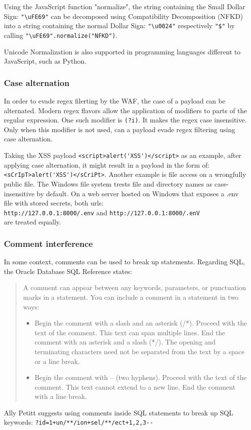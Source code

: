 Using the JavaScript function "normalize", the string containing the Small Dollar Sign: \verb|"\uFE69"| can be decomposed using Compatibility Decomposition (NFKD) into a string containing the normal Dollar Sign: \verb|"\u0024"| respectively \verb|"$"| by calling \verb|"\uFE69".normalize("NFKD")|.

Unicode Normalization is also supported in programming languages different to JavaScript, such as Python. \cite{python/normalization}


\subsubsection{Case alternation}
In order to evade regex filerting by the WAF, the case of a payload can be alternated. \cite{medium/allypetitt}
Modern regex flavors allow the application of modifiers to parts of the regular expression.
One such modifier is \verb|(?i)|. It makes the regex case insensitive. \cite{regex/jan} Only when this modifier is not used, can a payload evade regex filtering using case alternation.

Taking the XSS payload \verb|<script>alert('XSS')</script>| as an example, after applying case alternation, it might result in a payload in the form of: \verb|<sCrIpT>alert('XSS')</sCriPt>|.
Another example is file access on a wrongfully public file.
The Windows file system trests file and directory names as case-insensitive by default. \cite{windows/casesensitive}
On a web server hosted on Windows that exposes a .env file with stored secrets, both urls: \\ \verb|http://127.0.0.1:8000/.env| and \verb|http://127.0.0.1:8000/.enV| \\
are treated equally.


\subsubsection{Comment interference}
\label{sec:commint}
In some context, comments can be used to break up statements. Regarding SQL, the Oracle Database SQL Reference states:
\begin{quote}
	A comment can appear between any keywords, parameters, or punctuation marks in a statement. You can include a comment in a statement in two ways:
	\begin{itemize}
		\item Begin the comment with a slash and an asterisk (/*). Proceed with the text of the comment. This text can span multiple lines. End the comment with an asterisk and a slash (*/). The opening and terminating characters need not be separated from the text by a space or a line break.
		\item Begin the comment with -- (two hyphens). Proceed with the text of the comment. This text cannot extend to a new line. End the comment with a line break.
	\end{itemize}
	\cite{oracle/sqlcomments}
\end{quote}
Ally Petitt suggests using comments inside SQL statements to break up SQL keywords: \verb|?id=1+un/**/ion+sel/**/ect+1,2,3--| \cite{medium/allypetitt}


